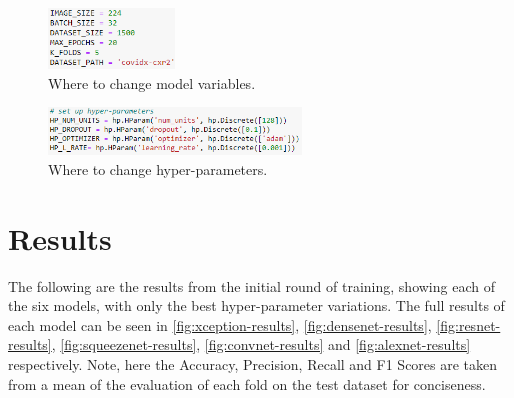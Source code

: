 \begin{figure}[H]
    \centering
    \includegraphics[width=0.3\textwidth]{figures/model-variables.png}
    \caption{Where to change model variables.}
    \label{fig:model-variables}
\end{figure}
\begin{figure}[H]
    \centering
    \includegraphics[width=0.6\textwidth]{figures/hyper-parameters-code.png}
    \caption{Where to change hyper-parameters.}
    \label{fig:hyper-parameters-code}
\end{figure}

\section{Results} \label{results}
The following are the results from the initial round of training, showing each of the six models, with only the best hyper-parameter variations. The full results of each model can be seen in \autoref{fig:xception-results}, \autoref{fig:densenet-results}, \autoref{fig:resnet-results}, \autoref{fig:squeezenet-results}, \autoref{fig:convnet-results} and \autoref{fig:alexnet-results} respectively. Note, here the Accuracy, Precision, Recall and F1 Scores are taken from a mean of the evaluation of each fold on the test dataset for conciseness.

